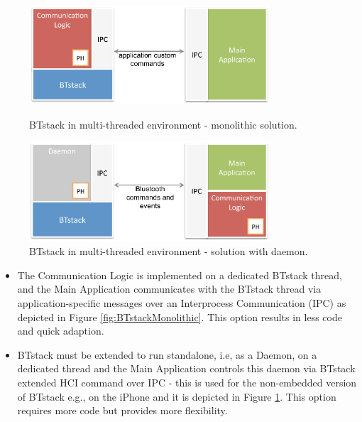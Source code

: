 \documentclass[a4paper,titlepage,oneside,12pt]{amsart} %
\begin{document}
\begin{figure}[ht]
\begin{minipage}[b]{\linewidth}
\centering
   \includegraphics[width=0.8\textwidth]{picts/multithreading-monolithic.pdf} 
   \caption{BTstack in multi-threaded environment - monolithic solution.}
   \label{fig:BTstackMonolithic}
\vspace{0.8cm}
\end{minipage}

\begin{minipage}[b]{\linewidth}
\centering
   \includegraphics[width=0.8\textwidth]{picts/multithreading-btdaemon.pdf} 
   \caption{BTstack in multi-threaded environment - solution with daemon.}
   \label{fig:BTstackDaemon}
\end{minipage}
\end{figure}

\begin{itemize}
\item The Communication Logic is implemented on a dedicated BTstack thread, and the Main Application communicates with the BTstack thread via application-specific messages over an Interprocess Communication (IPC) as depicted in Figure \ref{fig:BTstackMonolithic}. This option results in less code and quick adaption.
\item BTstack must be extended to run standalone, i.e, as a Daemon, on a dedicated thread and the Main Application controls this daemon via BTstack extended HCI command over IPC - this is used for the non-embedded version of BTstack e.g., on the iPhone and it is depicted in Figure \ref{fig:BTstackDaemon}. This option requires more code but provides more flexibility.
\end{itemize}
\end{document}
